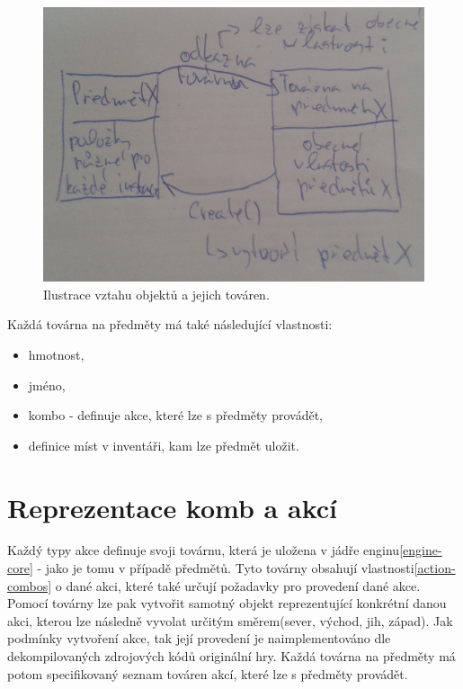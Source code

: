 \begin{figure}[H]\centering
\includegraphics[width=\textwidth]{./img/item-factories.png}
\caption{Ilustrace vztahu objektů a jejich továren.}
\label{item-factories}
\end{figure}

Každá továrna na předměty má také následující vlastnosti:
\begin{itemize}
\item hmotnost, 
\item jméno, 
\item kombo - definuje akce, které lze s předměty provádět,  
\item definice míst v inventáři, kam lze předmět uložit. 
\end{itemize}

\section{Reprezentace komb a akcí}
Každý typy akce definuje svoji továrnu, která je uložena v jádře enginu\vref{engine-core} - jako je tomu v případě předmětů.
Tyto továrny obsahují vlastnosti\vref{action-combos} o dané akci, které také určují požadavky pro provedení dané akce.
Pomocí továrny lze pak vytvořit samotný objekt reprezentující konkrétní danou akci, kterou lze následně vyvolat určitým 
směrem(sever, východ, jih, západ). Jak podmínky vytvoření akce, tak její provedení je naimplementováno dle dekompilovaných
zdrojových kódů\cite{DMDecompilation} originální hry. Každá továrna na předměty má potom specifikovaný seznam továren akcí,
které lze s předměty provádět.

